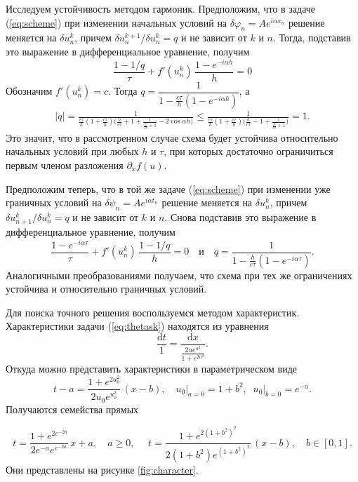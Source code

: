 \documentclass[a4paper,12pt]{article}
\def\mysection#1{\vspace{\baselineskip}{\noindent\large\centering\bf#1\par}}
\def\d{\mathrm{d}}
\begin{document}
\mysection{Устойчивость}
Исследуем устойчивость методом гармоник. Предположим, что в задаче (\ref{eq:scheme}) при изменении начальных условий на $\delta\varphi_n=Ae^{i\alpha x_n}$ решение меняется на $\delta u^k_n$, причем $\delta u^{k+1}_n/\delta u^k_n=q$ и не зависит от $k$ и $n$. Тогда, подставив это выражение в дифференциальное уравнение, получим
$$\frac{1-1/q}{\tau}+f'(u^k_n)\,\frac{1-e^{-i\alpha h}}{h}=0$$
Обозначим $f'(u^k_n)=c$. Тогда $q=\dfrac{1}{1-\frac{c\tau}{h}(1-e^{-i\alpha h})}$, а
\begin{equation*}
\begin{split}
\big|q\big|=\frac{1}{\frac{c\tau}{h}(1+\frac{c\tau}{h})\big(\frac{h}{c\tau}+1+\frac{1}{\frac{h}{c\tau}+1}-2\cos\alpha h\big)}\leq\frac{1}{\frac{c\tau}{h}(1+\frac{c\tau}{h})\big(\frac{h}{c\tau}-1+\frac{1}{\frac{h}{c\tau}+1}\big)}=1.
\end{split}
\end{equation*}
Это значит, что в рассмотренном случае схема будет устойчива относительно начальных условий при любых $h$ и $\tau$, при которых достаточно ограничиться первым членом разложения $\partial_x f(u)$.

Предположим теперь, что в той же задаче (\ref{eq:scheme}) при изменении уже граничных условий на $\delta\psi_n=Ae^{i\alpha t_n}$ решение меняется на $\delta u^k_n$, причем $\delta u^{k}_{n+1}/\delta u^k_n=q$ и не зависит от $k$ и $n$. Снова подставив это выражение в дифференциальное уравнение, получим
$$\frac{1-e^{-i\alpha\tau}}{\tau}+f'(u^k_n)\,\frac{1-1/q}{h}=0\quad\text{и}\quad q=\frac{1}{1-\frac{h}{c\tau}(1-e^{-i\alpha\tau})}.$$
Аналогичными преобразованиями получаем, что схема при тех же ограничениях устойчива и относительно граничных условий. 

\mysection{Аналитическое решение}
Для поиска точного решения воспользуемся методом характеристик. Характеристики задачи (\ref{eq:thetask}) находятся из уравнения
$$\frac{\d t}{1}=\frac{\d x}{\frac{2ue^{u^2}}{1+e^{2u^2}}}.$$
Откуда можно представить характеристики в параметрическом виде
$$t-a=\frac{1+e^{2u^2_0}}{2u_0e^{u^2_0}}\,(x-b),\quad u_0\big|_{a=0}=1+b^2,\;\;u_0\big|_{b=0}=e^{-a}.$$
Получаются семейства прямых\vspace{.2\baselineskip}\par\noindent
\begin{equation}
t=\frac{1+e^{2e^{-2a}}}{2e^{-a}e^{e^{-2a}}}\,x+a,\quad a\geq0,\ \ \ \ \ \  t=\frac{1+e^{2(1+b^2)^2}}{2(1+b^2)e^{(1+b^2)^2}}\,(x-b),\quad b\in[0,1].
\label{eq:ch}
\end{equation}
Они представлены на рисунке \ref{fig:character}.
\end{document}
